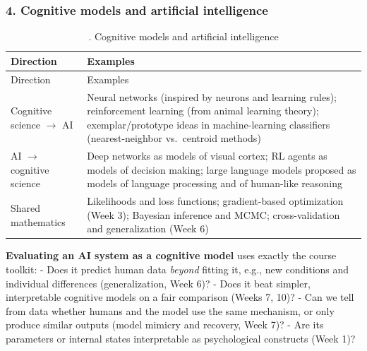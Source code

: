 \subsubsection{4. Cognitive models and artificial intelligence}

\begin{longtable}[]{@{}
  >{\raggedright\arraybackslash}p{}
  >{\raggedright\arraybackslash}p{}@{}}
\caption{. Cognitive models and artificial intelligence}\tabularnewline
\toprule\noalign{}
\begin{minipage}[b]{\linewidth}\raggedright
Direction
\end{minipage} & \begin{minipage}[b]{\linewidth}\raggedright
Examples
\end{minipage} \\
\midrule\noalign{}
\endfirsthead
\toprule\noalign{}
\begin{minipage}[b]{\linewidth}\raggedright
Direction
\end{minipage} & \begin{minipage}[b]{\linewidth}\raggedright
Examples
\end{minipage} \\
\midrule\noalign{}
\endhead
\bottomrule\noalign{}
\endlastfoot
Cognitive science \ensuremath{\rightarrow} AI & Neural networks (inspired by neurons and
learning rules); reinforcement learning (from animal learning theory);
exemplar/prototype ideas in machine-learning classifiers
(nearest-neighbor vs.~centroid methods) \\
AI \ensuremath{\rightarrow} cognitive science & Deep networks as models of visual cortex; RL
agents as models of decision making; large language models proposed as
models of language processing and of human-like reasoning \\
Shared mathematics & Likelihoods and loss functions; gradient-based
optimization (Week 3); Bayesian inference and MCMC; cross-validation and
generalization (Week 6) \\
\end{longtable}

\textbf{Evaluating an AI system as a cognitive model} uses exactly the
course toolkit: - Does it predict human data \emph{beyond} fitting it,
e.g., new conditions and individual differences (generalization, Week
6)? - Does it beat simpler, interpretable cognitive models on a fair
comparison (Weeks 7, 10)? - Can we tell from data whether humans and the
model use the same mechanism, or only produce similar outputs (model
mimicry and recovery, Week 7)? - Are its parameters or internal states
interpretable as psychological constructs (Week 1)?

